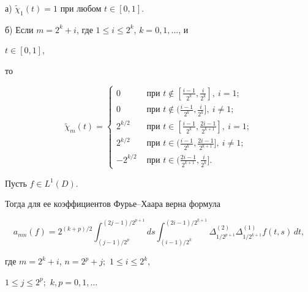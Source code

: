 \begin{defn}


а) $\widetilde\chi_1(t)=1$ при любом $t\in [0,1]$.


\newline


б) Если $m=2^k+i$, где $1\leqslant i\leqslant 2^k$, $k=0,1,\dotsc$, и


$t\in [0,1]$,


то


$$


\widetilde\chi_m(t)=


\begin{cases}


0& \text{ при } t\notin [\frac{i-1}{2^k}, \frac{i}{2^k}],\ i=1;\\


0& \text{ при } t\notin (\frac{i-1}{2^k}, \frac{i}{2^k}],\ i\neq1;\\


2^{k/2}& \text{ при }t\in [\frac{i-1}{2^k}, \frac{2i-1}{2^{k+1}}],\ i=1;\\


2^{k/2}& \text{ при }t\in (\frac{i-1}{2^k}, \frac{2i-1}{2^{k+1}}],\ i\neq1;\\


-2^{k/2}& \text{ при }t\in (\frac{2i-1}{2^{k+1}}, \frac{i}{2^k}].


\end{cases}


$$


\end{defn}





\begin{lem}


Пусть $f\in L^1(D)$.


Тогда для ее коэффициентов Фурье--Хаара верна формула


$$


a_{mn}(f) = 2^{(k+p)/2} \int_{(j-1)/2^p}^{(2j-1)/2^{p+1}} ds


\int_{(i-1)/2^k}^{(2i-1)/2^{k+1}}


\Delta_{1/2^{p+1}}^{(2)} \Delta_{1/2^{k+1}}^{(1)} f(t,s)\,dt,


$$


где $m=2^k+i$, $n=2^p+j;$ $1\leqslant i\leqslant 2^k$,


$1\leqslant j\leqslant 2^p;$ $k,p=0,1,\dotsc$


\end{lem}





